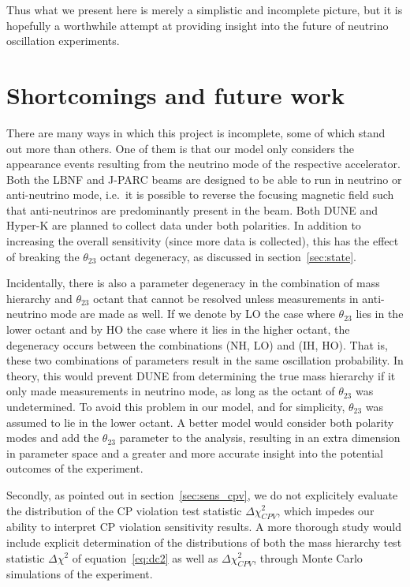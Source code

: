 Thus what we present here is merely a simplistic and incomplete picture, but it is
hopefully a worthwhile attempt at providing insight into the future of neutrino
oscillation experiments.


\section{Shortcomings and future work}
There are many ways in which this project is incomplete, some of which stand
out more than others. 
One of them is that our model only considers the appearance events resulting
from the neutrino mode of the respective accelerator. Both the LBNF and J-PARC
beams are designed to be able to run in neutrino or anti-neutrino mode,
i.e.~it is possible to reverse the focusing magnetic field such that
anti-neutrinos are predominantly present in the beam. Both DUNE and Hyper-K are
planned to collect data under both polarities.  In addition to increasing the
overall sensitivity (since more data is collected), this has the effect of
breaking the $\theta_{23}$ octant degeneracy, as discussed in section~\ref{sec:state}.

Incidentally, there is also a parameter degeneracy in the combination of mass
hierarchy and $\theta_{23}$ octant that cannot be resolved unless measurements
in anti-neutrino mode are made as well\cite{raut}. If we denote by LO the case
where $\theta_{23}$ lies in the lower octant and by HO the case where it lies
in the higher octant, the degeneracy occurs between the combinations (NH, LO)
and (IH, HO). That is, these two combinations of parameters result in the same
oscillation probability.
In theory, this would prevent DUNE from determining the true mass hierarchy if
it only made measurements in neutrino mode, as long as the octant of
$\theta_{23}$ was undetermined. To avoid this problem in our model, and for
simplicity, $\theta_{23}$ was assumed to lie in the lower octant.
A better model would consider both polarity modes and add the $\theta_{23}$
parameter to the analysis, resulting in an extra dimension in parameter space
and a greater and more accurate insight into the
potential outcomes of the experiment.

Secondly, as pointed out in section~\ref{sec:sens_cpv}, we do not explicitely
evaluate the distribution of the CP violation test statistic
$\Delta\chi^2_{CPV}$, which impedes our ability to interpret CP violation
sensitivity results. A more thorough study would include explicit determination
of the distributions of both the mass hierarchy test statistic $\Delta\chi^2$
of equation~\ref{eq:dc2} as well as $\Delta\chi^2_{CPV}$, through Monte Carlo
simulations of the experiment.


